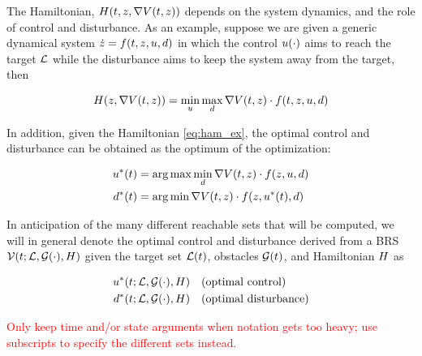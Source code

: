 The Hamiltonian, $H(t, z, \nabla V(t,z))$ depends on the system dynamics, and the role of control and disturbance. As an example, suppose we are given a generic dynamical system $\dot {z} = f(t, z, u, d)$ in which the control $u(\cdot)$ aims to reach the target $\mathcal{L}$ while the disturbance aims to keep the system away from the target, then

\begin{equation}
\label{eq:ham_ex}
\begin{aligned}
\ham(\state, \nabla \valfunc(t,\state)) = \min_\ctrl \max_\dstb \nabla \valfunc(t,\state) \cdot \fdyn(t, \state, \ctrl, \dstb)
\end{aligned}
\end{equation}

In addition, given the Hamiltonian \eqref{eq:ham_ex}, the optimal control and disturbance can be obtained as the optimum of the optimization:

\begin{equation}
\label{eq:opt_ctrl_dstb_ex}
\begin{aligned}
\ctrl^*(t) &= \arg \max \min_\dstb \nabla \valfunc(t,\state) \cdot \fdyn(\state, \ctrl, \dstb)\\
\dstb^*(t) &= \arg \min \nabla \valfunc(t,\state) \cdot \fdyn(\state, \ctrl^*(t), \dstb)
\end{aligned}
\end{equation}

In anticipation of the many different reachable sets that will be computed, we will in general denote the optimal control and disturbance derived from a BRS $\mathcal{V}(t; \mathcal{L}, \mathcal{G}(\cdot), H)$ given the target set $\mathcal{L}(t)$, obstacles $\mathcal{G}(t)$, and Hamiltonian $H$ as 

\begin{equation}
\label{eq:opt_ctrl}
\begin{aligned}
\ctrl^*(t; \targetset, \obsset(\cdot), \ham) &\quad \text{(optimal control)} \\
\dstb^*(t; \targetset, \obsset(\cdot), \ham) &\quad \text{(optimal disturbance)}
\end{aligned}
\end{equation}

\textcolor{red}{Only keep time and/or state arguments when notation gets too heavy; use subscripts to specify the different sets instead.}
